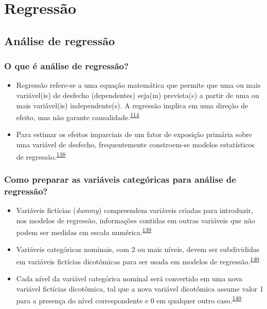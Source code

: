 \documentclass[
  a4paper,
]{book}
\begin{document}
\hypertarget{analise-inferencial-regressao}{%
\chapter{\texorpdfstring{\textbf{Regressão}}{Regressão}}\label{analise-inferencial-regressao}}

\hypertarget{analise-regressao}{%
\section{Análise de regressão}\label{analise-regressao}}

\hypertarget{o-que-uxe9-anuxe1lise-de-regressuxe3o}{%
\subsection{O que é análise de regressão?}\label{o-que-uxe9-anuxe1lise-de-regressuxe3o}}

\begin{itemize}
\item
  Regressão refere-se a uma equação matemática que permite que uma ou mais variável(is) de desfecho (dependentes) seja(m) prevista(s) a partir de uma ou mais variável(is) independente(s). A regressão implica em uma direção de efeito, mas não garante causalidade.\textsuperscript{\protect\hyperlink{ref-greenhalgh1997a}{114}}
\item
  Para estimar os efeitos imparciais de um fator de exposição primária sobre uma variável de desfecho, frequentemente constroem-se modelos estatísticos de regressão.\textsuperscript{\protect\hyperlink{ref-bandoli2018}{138}}
\end{itemize}

\hypertarget{como-preparar-as-variuxe1veis-categuxf3ricas-para-anuxe1lise-de-regressuxe3o}{%
\subsection{Como preparar as variáveis categóricas para análise de regressão?}\label{como-preparar-as-variuxe1veis-categuxf3ricas-para-anuxe1lise-de-regressuxe3o}}

\begin{itemize}
\item
  Variáveis fictícias (\emph{dummy}) compreendem variáveis criadas para introduzir, nos modelos de regressão, informações contidas em outras variáveis que não podem ser medidas em escala numérica.\textsuperscript{\protect\hyperlink{ref-suits1957}{139}}
\item
  Variáveis categóricas nominais, com 2 ou mais níveis, devem ser subdivididas em variáveis fictícias dicotômicas para ser usada em modelos de regressão.\textsuperscript{\protect\hyperlink{ref-Healy1995}{140}}
\item
  Cada nível da variável categórica nominal será convertido em uma nova variável fictícias dicotômica, tal que a nova variável dicotômica assume valor 1 para a presença do nível correspondente e 0 em qualquer outro caso.\textsuperscript{\protect\hyperlink{ref-Healy1995}{140}}
\end{itemize}
\end{document}
